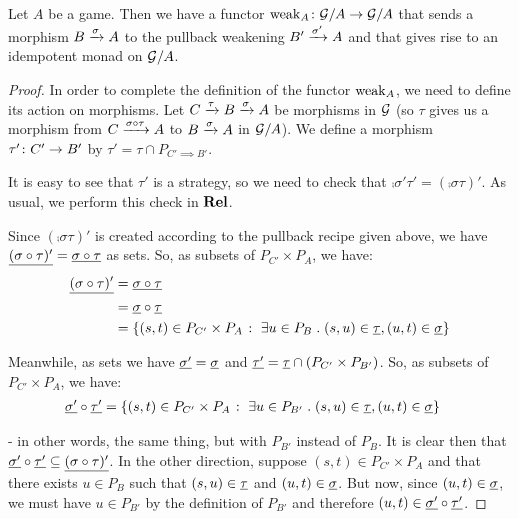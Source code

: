 \documentclass[11pt]{article} %
\begin{document}
\begin{theorem}
  Let $A$ be a game.  Then we have a functor $\cmap{\weak_A}{\G/A}{\G/A}$ that sends a morphism $\map{\sigma}{B}{A}$ to the pullback weakening $\map{\sigma'}{B'}{A}$ and that gives rise to an idempotent monad on $\G/A$.

  \begin{proof}
    In order to complete the definition of the functor $\weak_A$, we need to define its action on morphisms.  Let $C\xrightarrow{\tau}\map{\sigma}{B}{A}$ be morphisms in $\G$ (so $\tau$ gives us a morphism from $\map{\comp\sigma\tau}{C}{A}$ to $\map{\sigma}{B}{A}$ in $\G/A$).  We define a morphism $\cmap{\tau'}{C'}{B'}$ by $\tau'=\tau\cap P_{C'\implies B'}$.

    It is easy to see that $\tau'$ is a strategy, so we need to check that $\comp{\sigma'}{\tau'}=(\comp\sigma\tau)'$.  As usual, we perform this check in $\Rel$.

    Since $(\comp\sigma\tau)'$ is created according to the pullback recipe given above, we have $\grel{(\comp\sigma\tau)'}=\grel{\comp\sigma\tau}$ as sets.  So, as subsets of $P_{C'}\times P_A$, we have:
    \begin{align*}
      \grel{(\comp\sigma\tau)'} & = \grel{\comp\sigma\tau} \\
                                & = \comp{\grel\sigma}{\grel\tau} \\
                                & = \{(s, t)\in P_{C'}\times P_{A}\suchthat \exists u\in P_B \esuchthat (s,u)\in\grel\tau, (u,t)\in\grel\sigma\}
    \end{align*}

    Meanwhile, as sets we have $\grel{\sigma'}=\grel\sigma$ and $\grel{\tau'}=\grel\tau\cap (P_{C'}\times P_{B'})$.  So, as subsets of $P_{C'}\times P_A$, we have:
    \begin{align*}
      \comp{\grel{\sigma'}}{\grel{\tau'}} & = \{(s, t)\in P_{C'}\times P_A\suchthat \exists u\in P_{B'} \esuchthat (s,u)\in\grel\tau, (u,t)\in\grel\sigma\}
    \end{align*}

     - in other words, the same thing, but with $P_{B'}$ instead of $P_B$.  It is clear then that $\comp{\grel{\sigma'}}{\grel{\tau'}}\subset\grel{(\comp\sigma\tau)'}$.  In the other direction, suppose $(s,t)\in P_{C'}\times P_A$ and that there exists $u\in P_B$ such that $(s,u)\in\grel\tau$ and $(u,t)\in\grel\sigma$.  But now, since $(u,t)\in\grel\sigma$, we must have $u\in P_{B'}$ by the definition of $P_{B'}$ and therefore $(u,t)\in \comp{\grel{\sigma'}}{\grel{\tau'}}$.


\end{proof}
\end{theorem}
\end{document}

